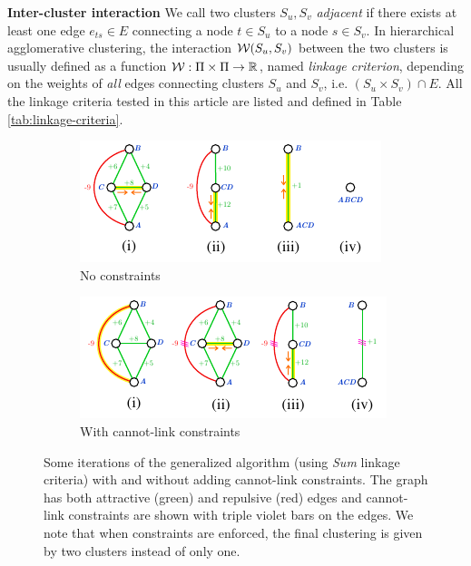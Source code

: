\textbf{Inter-cluster interaction } We call two clusters $S_u,S_v$ \emph{adjacent} if there exists at least one edge ${e_{ts}\in E}$ connecting a node $t\in S_u$ to a node $s\in S_v$. In hierarchical agglomerative clustering, the interaction $\mathcal{W}(S_u,S_v)$ between the two clusters is usually defined as a function $\mathcal{W}{}:\Pi \times \Pi \rightarrow \mathbb{R}$, named \emph{linkage criterion}, depending on the weights of \emph{all} edges connecting clusters $S_u$ and $S_v$, i.e. $(S_u \times S_v) \cap E$. 
All the linkage criteria tested in this article are listed and defined in Table \ref{tab:linkage-criteria}.

\begin{figure}
\centering
        \begin{subfigure}[t]{0.46 \textwidth}
        \centering
        \includegraphics[width=\textwidth]{./figs/example_no_constr.pdf}
        \caption{No constraints}\label{subfig:no_constraints}
    \end{subfigure} \hfill
    \begin{subfigure}[t]{0.46 \textwidth}
        \centering
        \includegraphics[width=\textwidth]{./figs/example_with_constr.pdf}
        \caption{With cannot-link constraints}\label{subfig:with_constraints}
    \end{subfigure}
\caption{Some iterations of the generalized algorithm (using \emph{Sum} linkage criteria) with and without adding cannot-link constraints. The graph has both attractive (green) and repulsive (red) edges and cannot-link constraints are shown with triple violet bars on the edges. We note that when constraints are enforced, the final clustering is given by two clusters instead of only one.}
\label{fig:algorithm_with_without_CLC}
\end{figure}
